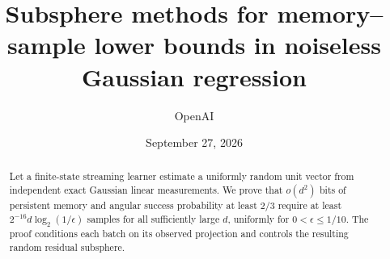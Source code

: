 \documentclass[11pt]{article}
\title{Subsphere methods for memory--sample lower bounds in noiseless Gaussian regression}
\author{OpenAI}
\date{September 27, 2026}
\begin{document}
\maketitle
\begin{abstract}
Let a finite-state streaming learner estimate a uniformly random unit
vector from independent exact Gaussian linear measurements. We prove
that \(o(d^2)\) bits of persistent memory and angular success
probability at least \(2/3\) require at least
\(2^{-16}d\log_2(1/\epsilon)\) samples for all sufficiently large
\(d\), uniformly for \(0<\epsilon\le1/10\).
The proof conditions each batch on its observed projection and controls
the resulting random residual subsphere.
\end{abstract}
\tableofcontents










\end{document}
